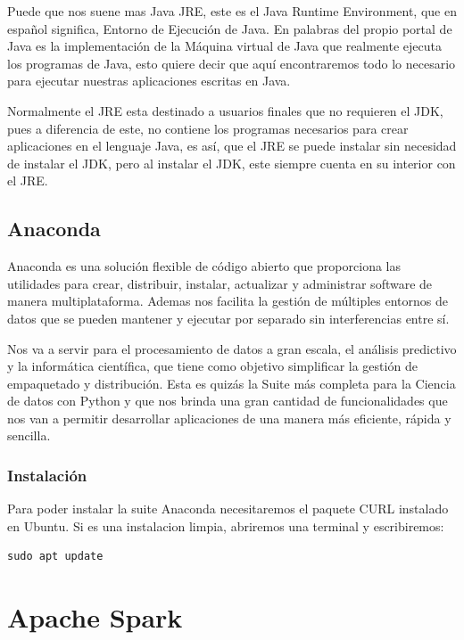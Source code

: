 \documentclass[a4paper,10pt]{article}
\begin{document}
Puede que nos suene mas Java JRE, este es el Java Runtime Environment, que en español significa, Entorno de Ejecución de Java. En palabras del propio portal de Java es la implementación de la Máquina virtual de Java que realmente ejecuta los programas de Java, esto quiere decir que aquí encontraremos todo lo necesario para ejecutar nuestras aplicaciones escritas en Java. 

Normalmente el JRE esta destinado a usuarios finales que no requieren el JDK, pues a diferencia de este, no contiene los programas necesarios para crear aplicaciones en el lenguaje Java, es así, que el JRE se puede instalar sin necesidad de instalar el JDK, pero al instalar el JDK, este siempre cuenta en su interior con el JRE.

\subsection{Anaconda}

Anaconda es una solución flexible de código abierto que proporciona las utilidades para crear, distribuir, instalar, actualizar y administrar software de manera multiplataforma. Ademas nos facilita la gestión de múltiples entornos de datos que se pueden mantener y ejecutar por separado sin interferencias entre sí.
 
Nos va a servir para el procesamiento de datos a gran escala, el análisis predictivo y la informática científica, que tiene como objetivo simplificar la gestión de empaquetado y distribución. Esta es quizás la Suite más completa para la Ciencia de datos con Python y que nos brinda una gran cantidad de funcionalidades que nos van a permitir desarrollar aplicaciones de una manera más eficiente, rápida y sencilla. 

\subsubsection{Instalación}

Para poder instalar la suite Anaconda necesitaremos el paquete CURL instalado en Ubuntu. Si es una instalacion limpia, abriremos una terminal y escribiremos:

\lstset{language=bash, breaklines=true, basicstyle=\ttfamily}
\begin{lstlisting}[frame=single]
sudo apt update
\end{lstlisting}

\clearpage

\section{Apache Spark}
\end{document}
